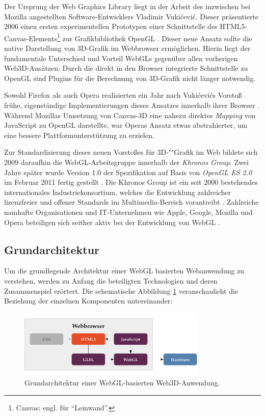 Der Ursprung der Web Graphics Library liegt in der Arbeit des inzwischen bei Mozilla angestellten Software-Entwicklers Vladimir Vukićević. Dieser präsentierte 2006 einen ersten experimentellen Prototypen einer Schnittstelle des HTML5-Canvas-Elements\footnote{Canvas: engl. für \enquote{Leinwand}.} zur Grafikbibliothek OpenGL \autocite{WEBGL_ORIGIN_VUKICEVIC}.
Dieser neue Ansatz sollte die native Darstellung von 3D-Grafik im Webbrowser ermöglichen. Hierin liegt der fundamentale Unterschied und Vorteil WebGLs gegenüber allen vorherigen Web3D-Ansätzen: Durch die direkt in den Browser integrierte Schnittstelle zu OpenGL sind Plugins für die Berechnung von 3D-Grafik nicht länger notwendig.

Sowohl Firefox als auch Opera realisierten ein Jahr nach Vukićevićs Vorstoß frühe, eigenständige Implementierungen dieses Ansatzes innerhalb ihrer Browser \autocite{WEBGL_ORIGIN_VUKICEVIC} \autocite{WEBGL_ORIGIN_OPERA}. Während Mozillas Umsetzung von Canvas-3D eine nahezu direktes \emph{Mapping} von JavaScript zu OpenGL darstellte, war Operas Ansatz etwas abstrahierter, um eine bessere Plattformunterstützung zu erzielen.

Zur Standardisierung dieses neuen Vorstoßes für 3D-""Grafik im Web bildete sich 2009 daraufhin die WebGL-Arbeitsgruppe innerhalb der \textit{Khronos Group}. Zwei Jahre später wurde Version 1.0 der Spezifikation auf Basis von \emph{OpenGL ES 2.0} im Februar 2011 fertig gestellt \autocite{KHRONOS_WEBGL_SPEC_10}. Die Khronos Group ist ein seit 2000 bestehendes internationales Industriekonsortium, welches die Entwicklung zahlreicher lizenzfreier und offener Standards im Multimedia-Bereich vorantreibt \autocite{KHRONOS_GROUP_ABOUT}. Zahlreiche namhafte Organisationen und IT-Unternehmen wie Apple, Google, Mozilla und Opera beteiligen sich seither aktiv bei der Entwicklung von WebGL \autocite{KHRONOS_GROUP_WEBGL}.

\subsection{Grundarchitektur}


Um die grundlegende Architektur einer WebGL basierten Webanwendung zu verstehen, werden zu Anfang die beteiligten Technologien und deren Zusammenspiel erörtert. Die schematische Abbildung \ref{FIG:WEBGL_ARCHITECTURE} veranschaulicht die Beziehung der einzelnen Komponenten untereinander:

\begin{figure}[ht]
	\centering
	\includegraphics[width=0.8\textwidth]{kap4/webgl/figures/architecture-crop.pdf}
	\caption{Grundarchitektur einer WebGL-basierten Web3D-Anwendung.}
	\label{FIG:WEBGL_ARCHITECTURE}
\end{figure}

